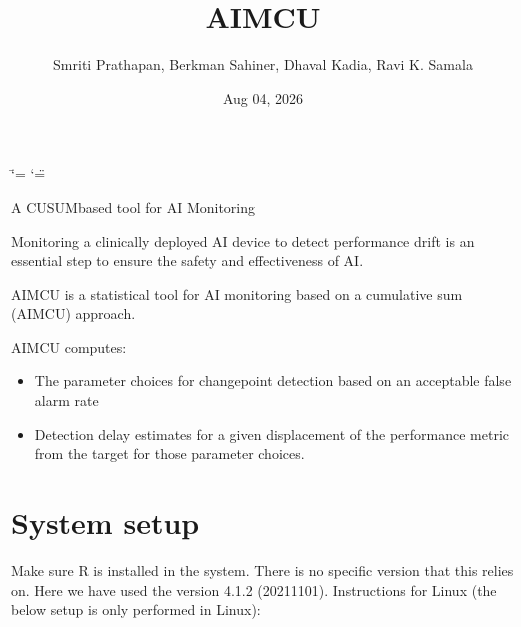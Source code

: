 \documentclass[letterpaper,10pt,oneside,english]{sphinxmanual}
\title{AIM\sphinxhyphen{}CU}
\date{Aug 04, 2026}
\author{Smriti Prathapan, Berkman Sahiner, Dhaval Kadia, Ravi K.\@{} Samala}
\begin{document}
\ifdefined\shorthandoff
  \ifnum\catcode`\=\string=\active\shorthandoff{=}\fi
  \ifnum\catcode`\"=\active{}\fi
\fi

\pagestyle{empty}
\sphinxmaketitle
\pagestyle{plain}
\sphinxtableofcontents
\pagestyle{normal}
\label{\detokenize{index::doc}}


\sphinxAtStartPar
A CUSUM\sphinxhyphen{}based tool for AI Monitoring

\sphinxAtStartPar
Monitoring a clinically deployed AI device to detect performance drift is an essential step to ensure the safety and effectiveness of AI.

\sphinxAtStartPar
AIM\sphinxhyphen{}CU is a statistical tool for AI monitoring based on a cumulative sum (AIM\sphinxhyphen{}CU) approach.

\sphinxAtStartPar
AIM\sphinxhyphen{}CU computes:
\begin{itemize}
\item {} 
\sphinxAtStartPar
The parameter choices for change\sphinxhyphen{}point detection based on an acceptable false alarm rate

\item {} 
\sphinxAtStartPar
Detection delay estimates for a given displacement of the performance metric from the target for those parameter choices.

\end{itemize}


\chapter{System setup}
\label{\detokenize{index:system-setup}}
\sphinxAtStartPar
Make sure R is installed in the system. There is no specific version that this relies on. Here we have used the version 4.1.2 (2021\sphinxhyphen{}11\sphinxhyphen{}01).
Instructions for Linux (the below setup is only performed in Linux):
\end{document}
